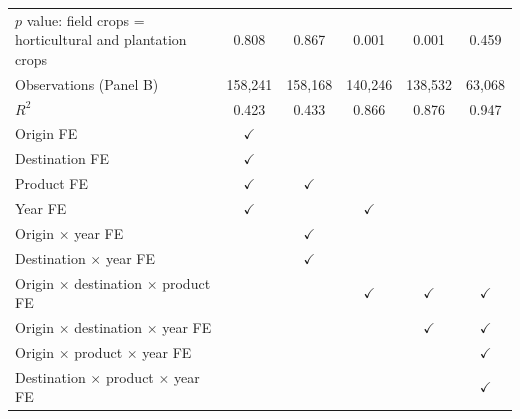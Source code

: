 \begin{tabular}{l*{5}{c}}
$p$ value: field crops = horticultural and plantation crops & 0.808 & 0.867 & 0.001 & 0.001 & 0.459 \\
Observations (Panel B) & 158,241 & 158,168 & 140,246 & 138,532 & 63,068 \\
$R^2$ & 0.423 & 0.433 & 0.866 & 0.876 & 0.947 \\
\midrule
Origin FE & $\checkmark$ &  &  &  &  \\
Destination FE & $\checkmark$ &  &  &  &  \\
Product FE & $\checkmark$ & $\checkmark$ &  &  &  \\
Year FE & $\checkmark$ &  & $\checkmark$ &  &  \\
Origin $\times$ year FE &  & $\checkmark$ &  &  &  \\
Destination $\times$ year FE &  & $\checkmark$ &  &  &  \\
Origin $\times$ destination $\times$ product FE &  &  & $\checkmark$ & $\checkmark$ & $\checkmark$ \\
Origin $\times$ destination $\times$ year FE &  &  &  & $\checkmark$ & $\checkmark$ \\
Origin $\times$ product $\times$ year FE &  &  &  &  & $\checkmark$ \\
Destination $\times$ product $\times$ year FE &  &  &  &  & $\checkmark$ \\
\bottomrule
\end{tabular}
